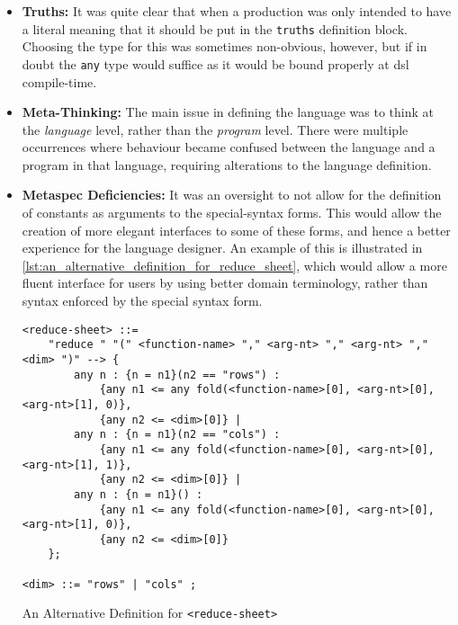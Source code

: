 \begin{itemize}
    \item \textbf{Truths:} It was quite clear that when a production was only intended to have a literal meaning that it should be put in the \texttt{truths} definition block.
    Choosing the type for this was sometimes non-obvious, however, but if in doubt the \texttt{any} type would suffice as it would be bound properly at \gls{dsl} compile-time.
    \item \textbf{Meta-Thinking:} The main issue in defining the language was to think at the \textit{language} level, rather than the \textit{program} level.
    There were multiple occurrences where behaviour became confused between the language and a program in that language, requiring alterations to the language definition. 
    \item \textbf{Metaspec Deficiencies:} It was an oversight to not allow for the definition of constants as arguments to the special-syntax forms. 
    This would allow the creation of more elegant interfaces to some of these forms, and hence a better experience for the language designer.
    An example of this is illustrated in \autoref{lst:an_alternative_definition_for_reduce_sheet}, which would allow a more fluent interface for users by using better domain terminology, rather than syntax enforced by the special syntax form. 
\begin{listing}[!htb]
\begin{verbatim}
<reduce-sheet> ::= 
    "reduce " "(" <function-name> "," <arg-nt> "," <arg-nt> "," <dim> ")" --> {
        any n : {n = n1}(n2 == "rows") : 
            {any n1 <= any fold(<function-name>[0], <arg-nt>[0], <arg-nt>[1], 0)},
            {any n2 <= <dim>[0]} |
        any n : {n = n1}(n2 == "cols") : 
            {any n1 <= any fold(<function-name>[0], <arg-nt>[0], <arg-nt>[1], 1)},
            {any n2 <= <dim>[0]} |
        any n : {n = n1}() : 
            {any n1 <= any fold(<function-name>[0], <arg-nt>[0], <arg-nt>[1], 0)},
            {any n2 <= <dim>[0]}
    };

<dim> ::= "rows" | "cols" ;
\end{verbatim}
\caption{An Alternative Definition for \texttt{<reduce-sheet>}}
\label{lst:an_alternative_definition_for_reduce_sheet}
\end{listing}


\end{itemize}
